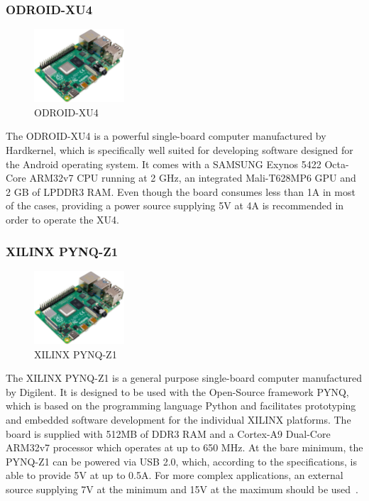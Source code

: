\subsubsection{ODROID-XU4}

\begin{figure}[h]
    \centering
    \includegraphics[width=0.30\textwidth]{./figures/mesh}
    \caption{ODROID-XU4}
    \label{fig:odroid-xu4}
\end{figure}

The ODROID-XU4 is a powerful single-board computer manufactured by Hardkernel, which is specifically well suited for developing software designed for the Android operating system. It comes with a SAMSUNG Exynos 5422 Octa-Core ARM32v7 CPU running at 2 GHz, an integrated Mali-T628MP6 GPU and 2 GB of LPDDR3 RAM. Even though the board consumes less than 1A in most of the cases, providing a power source supplying 5V at 4A is recommended in order to operate the XU4.~\parencite{odroid-xu4-manual}

\subsubsection{XILINX PYNQ-Z1}

\begin{figure}[h]
    \centering
    \includegraphics[width=0.30\textwidth]{./figures/mesh}
    \caption{XILINX PYNQ-Z1}
    \label{fig:xilinx-pynq-z1}
\end{figure}

The XILINX PYNQ-Z1 is a general purpose single-board computer manufactured by Digilent. It is designed to be used with the Open-Source framework PYNQ, which is based on the programming language Python and facilitates prototyping and embedded software development for the individual XILINX platforms. The board is supplied with 512MB of DDR3 RAM and a Cortex-A9 Dual-Core ARM32v7 processor which operates at up to 650 MHz. At the bare minimum, the PYNQ-Z1 can be powered via USB 2.0, which, according to the specifications, is able to provide 5V at up to 0.5A. For more complex applications, an external source supplying 7V at the minimum and 15V at the maximum should be used~\parencite{pynq-z1-manual}.

